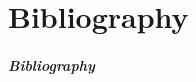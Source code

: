 %
%

\ifx\bibliocommand\undefined
\else
	\part{Bibliography}
	\begin{frame}[allowframebreaks]
	\frametitle{Bibliography}
	
	\def\newblock{}
	\bibliocommand
	\end{frame}
\fi
